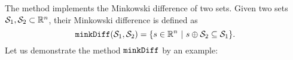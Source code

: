 \label{sec:minkDiff}

The method  implements the Minkowski difference of two sets. Given two sets $\mathcal{S}_1,\mathcal{S}_2 \subset \mathbb{R}^n$, their Minkowski difference is defined as 
\begin{equation*}
	{\normalfont \texttt{minkDiff}}(\mathcal{S}_1,\mathcal{S}_2) = \{ s \in \mathbb{R}^n ~|~ s \oplus \mathcal{S}_2 \subseteq \mathcal{S}_1 \}.
\end{equation*}
Let us demonstrate the method ${\normalfont \texttt{minkDiff}}$ by an example:

\begin{center}
	\begin{minipage}[t]{0.35\textwidth}
		\vspace{10pt}
		\footnotesize
		
	\end{minipage}
	\begin{minipage}[t]{0.6\textwidth}
		\vspace{0pt}
		\centering
	\end{minipage}
\end{center}
